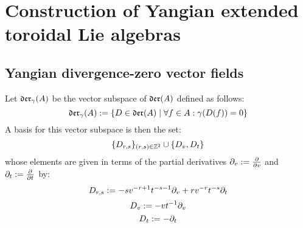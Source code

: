 \section{Construction of Yangian extended toroidal Lie algebras}
    \subsection{Yangian divergence-zero vector fields}
        \begin{lemma} \label{lemma: yangian_div_zero_vector_fields_basis}
            Let $\mathfrak{der}_{\gamma}(A)$ be the vector subspace of $\mathfrak{der}(A)$ defined as follows:
                $$\mathfrak{der}_{\gamma}(A) := \{ D \in \mathfrak{der}(A) \mid \forall f \in A: \gamma(D(f)) = 0 \}$$
            A basis for this vector subspace is then the set:
                $$\{D_{r, s}\}_{(r, s) \in \mathbb{Z}^2} \cup \{D_v, D_t\}$$
            whose elements are given in terms of the partial derivatives $\partial_v := \frac{\partial}{\partial v}$ and $\partial_t := \frac{\partial}{\partial t}$ by:
                $$D_{r, s} := -s v^{-r + 1} t^{-s - 1} \partial_v + r v^{-r} t^{-s} \partial_t$$
                $$D_v := -v t^{-1} \partial_v$$
                $$D_t := -\partial_t$$
        \end{lemma}
